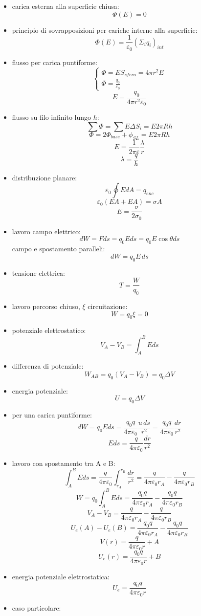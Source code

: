 \documentclass[a4paper,12pt, oneside]{book}
\begin{document}
\begin{itemize}
\item carica esterna alla superficie chiusa:
$$\Phi(E)=0$$
\item principio di sovrapposizioni per cariche interne alla superficie:
$$\Phi(E)=\frac{1}{\varepsilon_0}(\Sigma_iq_i)_{int}$$
\item flusso per carica puntiforme:
$$\begin{cases}
\Phi=ES_{sfera}=4\pi r^2 E\\
\Phi=\frac{q_0}{\varepsilon_0}
\end{cases}
$$
$$E=\frac{q_0}{4\pi r^2 \varepsilon_0}$$
\item flusso su filo infinito lungo $h$:
$$\sum \Phi=\sum E\Delta S_i=E2\pi Rh$$
$$\Phi=2\Phi_{base}+\phi_{SL}=E2\pi Rh$$
$$E=\frac{1}{2\pi\varepsilon}\frac{\lambda}{r}$$
$$\lambda=\frac{q}{h}$$
\item distribuzione planare:
$$\varepsilon_0\oint EdA=q_{enc}$$
$$\varepsilon_0(EA+EA)=\sigma A$$
$$E=\frac{\sigma}{2\sigma_0}$$
\item lavoro campo elettrico:
$$dW=Fds=q_0Eds=q_0E\cos \theta ds$$
campo e spostamento paralleli:
$$dW=q_0E\,ds$$
\item tensione elettrica:
$$T=\frac{W}{q_0}$$
\item lavoro percorso chiuso, $\xi$ circuitazione:
$$W=q_0\xi=0$$
\item potenziale elettrostatico:
$$V_A-V_B=\int_A^B Eds$$
\item differenza di potenziale:
$$W_{AB}=q_0(V_A-V_B)=q_0\Delta V$$
\item energia potenziale:
$$U=q_0\Delta V$$
\item per una carica puntiforme:
$$dW=q_0Eds=\frac{q_0q}{4\pi\varepsilon_0}\frac{u\,ds}{r^2}=\frac{q_0q}{4\pi\varepsilon_0}\frac{dr}{r^2}$$
$$Eds=\frac{q}{4\pi\varepsilon_0}\frac{dr}{r^2}$$
\item lavoro con spostamento tra A e B:
$$\int_A^B Eds=\frac{q}{4\pi\varepsilon_0}\int_{r_A}^{r_B}\frac{dr}{r^2}=\frac{q}{4\pi\varepsilon_0r_A}-\frac{q}{4\pi\varepsilon_0r_B}$$
$$W=q_0\int_A^B Eds=\frac{q_0q}{4\pi\varepsilon_0r_A}-\frac{q_0q}{4\pi\varepsilon_0r_B}$$
$$V_A-V_B=\frac{q}{4\pi\varepsilon_0r_A}-\frac{q}{4\pi\varepsilon_0r_B}$$
$$U_e(A)-U_e(B)=\frac{q_0q}{4\pi\varepsilon_0r_A}-\frac{q_0q}{4\pi\varepsilon_0r_B}$$
$$V(r)=\frac{q}{4\pi\varepsilon_0r}+A$$
$$U_e(r)=\frac{q_0q}{4\pi\varepsilon_0r}+B$$
\item energia potenziale elettrostatica:
$$U_e=\frac{q_0q}{4\pi\varepsilon_0r}$$
\item caso particolare:

\end{itemize}
\end{document}
